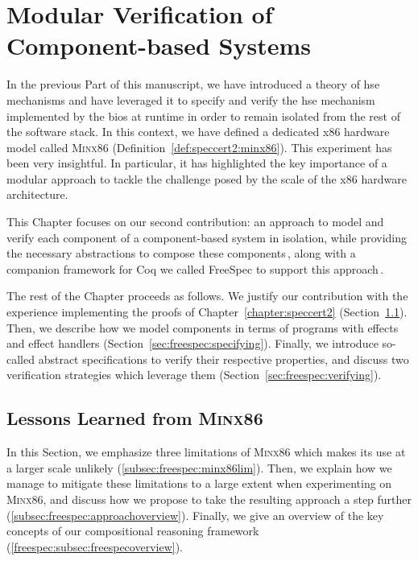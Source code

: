 \chapter{Modular Verification of Component-based Systems}
\label{chapter:freespec}


\vspace{1cm}%
\noindent
%
In the previous Part of this manuscript, we have introduced a theory of \ac{hse}
mechanisms and have leveraged it to specify and verify the \ac{hse} mechanism
implemented by the \ac{bios} at runtime in order to remain isolated from the
rest of the software stack.
%
In this context, we have defined a dedicated x86 hardware model called {\scshape
  Minx86} (Definition~\ref{def:speccert2:minx86}).
%
This experiment has been very insightful.
%
In particular, it has highlighted the key importance of a modular approach to
tackle the challenge posed by the scale of the x86 hardware architecture.
%

This Chapter focuses on our second contribution: an approach to model and verify
each component of a component-based system in isolation, while providing the
necessary abstractions to compose these components\,\cite{letan2018freespec},
along with a companion framework for Coq we called FreeSpec to support this
approach\,\cite{letan2018freespeccode}.

The rest of the Chapter proceeds as follows.
%
We justify our contribution with the experience implementing the proofs of
Chapter~\ref{chapter:speccert2} (Section~\ref{sec:freespec:why}).
%
Then, we describe how we model components in terms of programs with effects and
effect handlers (Section~\ref{sec:freespec:specifying}).
%
Finally, we introduce so-called abstract specifications to verify their
respective properties, and discuss two verification strategies which leverage
them (Section~\ref{sec:freespec:verifying}).

\section{Lessons Learned from {\scshape Minx86}}
\label{sec:freespec:why}

In this Section, we emphasize three limitations of {\scshape Minx86} which makes
its use at a larger scale unlikely (\ref{subsec:freespec:minx86lim}).
%
Then, we explain how we manage to mitigate these limitations to a large extent
when experimenting on {\scshape Minx86}, and discuss how we propose to take the
resulting approach a step further (\ref{subsec:freespec:approachoverview}).
%
Finally, we give an overview of the key concepts of our compositional reasoning
framework (\ref{freespec:subsec:freespecoverview}).

